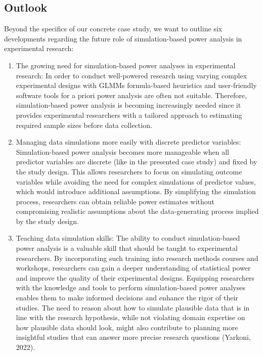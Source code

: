 \documentclass[
  man,floatsintext]{apa6}
\begin{document}
\hypertarget{outlook}{%
\subsection{Outlook}\label{outlook}}

Beyond the specifics of our concrete case study, we want to outline six developments regarding the future role of simulation-based power analysis in experimental research:

\begin{enumerate}
\def\labelenumi{\arabic{enumi}.}
\item
  The growing need for simulation-based power analyses in experimental research: In order to conduct well-powered research using varying complex experimental designs with GLMMs formula-based heuristics and user-friendly software tools for a priori power analysis are often not suitable. Therefore, simulation-based power analysis is becoming increasingly needed since it provides experimental researchers with a tailored approach to estimating required sample sizes before data collection.
\item
  Managing data simulations more easily with discrete predictor variables: Simulation-based power analysis becomes more manageable when all predictor variables are discrete (like in the presented case study) and fixed by the study design.
  This allows researchers to focus on simulating outcome variables while avoiding the need for complex simulations of predictor values, which would introduce additional assumptions. By simplifying the simulation process, researchers can obtain reliable power estimates without compromising realistic assumptions about the data-generating process implied by the study design.
\item
  Teaching data simulation skills: The ability to conduct simulation-based power analysis is a valuable skill that should be taught to experimental researchers. By incorporating such training into research methods courses and workshops, researchers can gain a deeper understanding of statistical power and improve the quality of their experimental designs.
  Equipping researchers with the knowledge and tools to perform simulation-based power analyses enables them to make informed decisions and enhance the rigor of their studies.
  The need to reason about how to simulate plausible data that is in line with the research hypothesis, while not violating domain expertise on how plausible data should look, might also contribute to planning more insightful studies that can answer more precise research questions (Yarkoni, 2022).

\end{enumerate}
\end{document}
